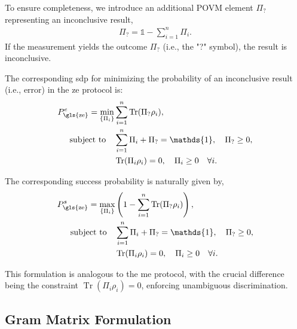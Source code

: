 \documentclass[12pt,letterpaper]{article}
\DeclareMathOperator{\tr}{Tr}
\begin{document}
\begin{multicols}{2}
To ensure completeness, we introduce an additional POVM element $\Pi_?$ representing an inconclusive result,
\begin{align*}
\Pi_? = \mathds{1} - \sum_{i=1}^n \Pi_i.
\end{align*}
If the measurement yields the outcome $\Pi_?$ (i.e., the "?" symbol), the result is inconclusive.

The corresponding \gls{sdp} for minimizing the probability of an inconclusive result (i.e., error) in the \gls{ze} protocol is:
\begin{align*}
	P_{\text{\gls{ze}}}^e = \min_{\left\{\Pi_i\right\}} &\sum_{i=1}^n \tr(\Pi_? \rho_i),\\
	\text{subject to} \quad & \sum_{i=1}^n \Pi_i + \Pi_? = \mathds{1}, \quad \Pi_? \geq 0,\\
	& \tr(\Pi_i \rho_i) = 0, \quad \Pi_i \geq 0 \quad \forall i.
\end{align*}

The corresponding success probability is naturally given by,
\begin{align*}
	P_{\text{\gls{ze}}}^s = \max_{\left\{\Pi_i\right\}} &\left(1 - \sum_{i=1}^n \tr(\Pi_? \rho_i)\right),\\
	\text{subject to} \quad & \sum_{i=1}^n \Pi_i + \Pi_? = \mathds{1}, \quad \Pi_? \geq 0,\\
	& \tr(\Pi_i \rho_i) = 0, \quad \Pi_i \geq 0 \quad \forall i.
\end{align*}

This formulation is analogous to the \gls{me} protocol, with the crucial difference being the constraint $\tr(\Pi_i \rho_i) = 0$, enforcing unambiguous discrimination.

\subsection{Gram Matrix Formulation}\label{sectionGramMatrixFormulation}


\end{multicols}
\end{document}
